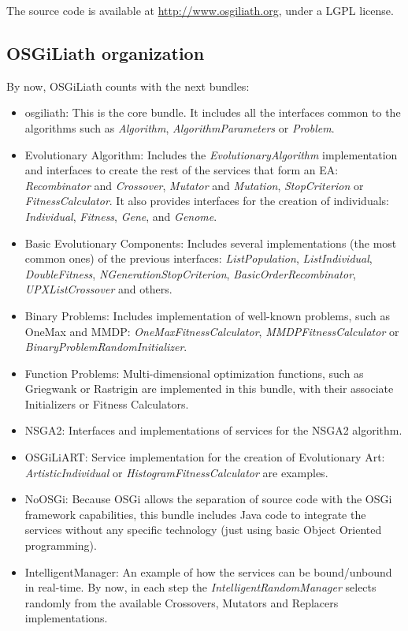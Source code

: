\documentclass{sig-alternate}
\begin{document}
The source code is available at \url{http://www.osgiliath.org}, under a LGPL license.

\subsection{OSGiLiath organization}

By now, OSGiLiath counts with the next bundles:

\begin{itemize}
\item osgiliath: This is the core bundle. It includes all the interfaces common to the algorithms such as {\em Algorithm}, {\em AlgorithmParameters} or {\em Problem}. 
\item Evolutionary Algorithm:  Includes the {\em EvolutionaryAlgorithm} implementation and interfaces to create the rest of the services that form an EA: {\em Recombinator} and {\em Crossover}, {\em Mutator} and {\em Mutation}, {\em StopCriterion} or {\em FitnessCalculator}. It also provides interfaces for the creation of individuals: {\em Individual}, {\em Fitness}, {\em Gene}, and {\em Genome}. 
\item Basic Evolutionary Components: Includes several implementations (the most common ones) of the previous interfaces: {\em ListPopulation}, {\em ListIndividual}, {\em DoubleFitness}, {\em NGenerationStopCriterion}, {\em BasicOrderRecombinator}, {\em UPXListCrossover} and others.
\item Binary Problems: Includes implementation of well-known problems, such as OneMax and MMDP: {\em OneMaxFitnessCalculator}, {\em MMDPFitnessCalculator} or {\em BinaryProblemRandomInitializer}.
\item Function Problems: Multi-dimensional optimization functions, such as Griegwank or Rastrigin are implemented in this bundle, with their associate Initializers or Fitness Calculators.
\item NSGA2: Interfaces and implementations of services for the NSGA2 algorithm.
\item OSGiLiART: Service implementation for the creation of Evolutionary Art: {\em ArtisticIndividual} or {\em HistogramFitnessCalculator} are examples.
\item NoOSGi: Because OSGi allows the separation of source code with the OSGi framework capabilities, this bundle includes Java code to integrate the services without any specific technology (just using basic Object Oriented programming).
\item IntelligentManager: An example of how the services can be bound/unbound in real-time. By now, in each step the {\em IntelligentRandomManager} selects randomly from the available Crossovers, Mutators and Replacers implementations.
\end{itemize}
\end{document}

